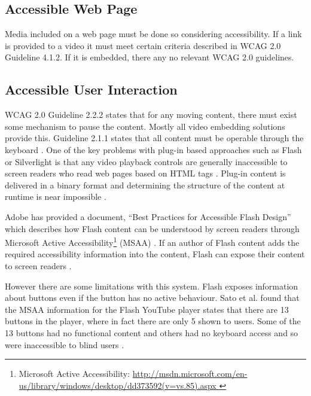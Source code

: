 \documentclass[journal]{IEEEtran}
\begin{document}
\subsection{Accessible Web Page}
Media included on a web page must be done so considering accessibility. If a link is provided to a video it must meet certain criteria described in WCAG 2.0 Guideline 4.1.2. If it is embedded, there any no relevant WCAG 2.0 guidelines.

\subsection{Accessible User Interaction}
WCAG 2.0 Guideline 2.2.2 states that for any moving content, there must exist some mechanism to pause the content. Mostly all video embedding solutions provide this. Guideline 2.1.1 states that all content must be operable through the keyboard \cite{standard:wcag2}. One of the key problems with plug-in based approaches such as Flash or Silverlight is that any video playback controls are generally inaccessible to screen readers who read web pages based on HTML tags \cite{inproceedings:transformingFlashToXML}\cite{incollection:accessibilityEvaluationForMultimediaContent}. Plug-in content is delivered in a binary format and determining the structure of the content at runtime is near impossible \cite{inproceedings:transformingFlashToXML}.

Adobe has provided a document, ``Best Practices for Accessible Flash Design'' which describes how Flash content can be understood by screen readers through Microsoft Active Accessibility\footnote{Microsoft Active Accessibility: \url{http://msdn.microsoft.com/en-us/library/windows/desktop/dd373592(v=vs.85).aspx
}} (MSAA) \cite{whitePaper:bestPracticesForAccessibleFlashDesign}. If an author of Flash content adds the required accessibility information into the content, Flash can expose their content to screen readers \cite{inproceedings:automaticAccesibilityTranscodingForFlashContent}.

However there are some limitations with this system. Flash exposes information about buttons even if the button has no active behaviour. Sato et al. found that the MSAA information for the Flash YouTube player states that there are 13 buttons in the player, where in fact there are only 5 shown to users. Some of the 13 buttons had no functional content and others had no keyboard access and so were inaccessible to blind users \cite{inproceedings:automaticAccesibilityTranscodingForFlashContent}.
\end{document}
